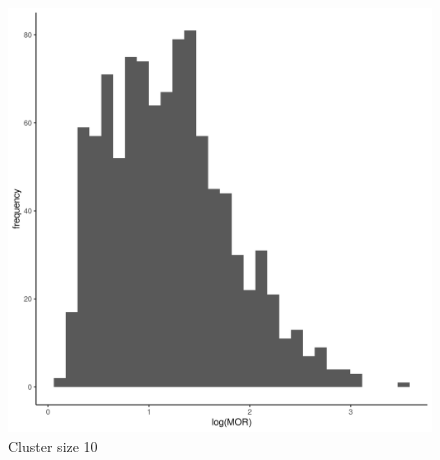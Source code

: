 \documentclass[
  letterpaper,
  DIV=11,
  numbers=noendperiod,
  titlepage]{scrartcl}
\begin{document}
\begin{figure}
\begin{minipage}[t]{0.24\linewidth}
{{\includegraphics{../../plots/two-lvl-ran-slope/low-prev/hist_50_10_two_lvl_slp_low_prev_q1.png}

}

\caption{Cluster size 10}

}

\end{minipage}%
%
\begin{minipage}[t]{0.24\linewidth}

{\centering 

}
\end{minipage}
\end{figure}
\end{document}
